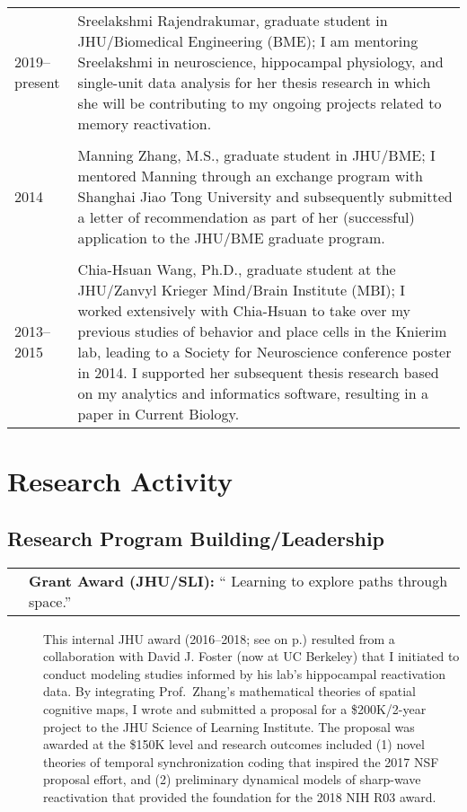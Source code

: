 \documentclass[10pt]{article}
\makeatletter
\newcommand{\unpubtitle}[1]{{\color{hopkinsblue} #1}}
\newcommand{\researchnote}[1]{
  \begin{description}
    \item[] {\hspace{2.2ex}\color{darkgray} #1}
  \end{description}
}
\newcommand{\researchactivity}[4]{
  \begin{minipage}[t]{\textwidth}
    \begin{tabular}{@{\hspace{2ex}}l>{\raggedright\arraybackslash}p{.8\textwidth}}
      \makebox[1.2in][l]{#1} & \textbf{#2:}
      ``\unpubtitle{#3}.'' 
    \end{tabular}
  \researchnote{\hspace{1ex} #4}
  \end{minipage}
  \medbreak
}
\makeatother
\begin{document}
\begin{tabular}{@{\hspace{0.2in}}l>{\raggedright\arraybackslash}p{}}
  2019--present \hspace{0.1in} & Sreelakshmi Rajendrakumar, graduate student in
  JHU/Biomedical Engineering (BME); I am mentoring Sreelakshmi in neuroscience,
  hippocampal physiology, and single-unit data analysis for her thesis research
  in which she will be contributing to my ongoing projects related to memory
  reactivation.\\
  \tabularnewline
  2014 & Manning Zhang, M.S., graduate student in JHU/BME; I mentored Manning
  through an exchange program with Shanghai Jiao Tong University and
  subsequently submitted a letter of recommendation as part of her (successful)
  application to the JHU/BME graduate program.\\
  \tabularnewline
  2013--2015 & Chia-Hsuan Wang, Ph.D., graduate student at the JHU/Zanvyl
  Krieger Mind/Brain Institute (MBI); I worked extensively with Chia-Hsuan to
  take over my previous studies of behavior and place cells in the Knierim lab,
  leading to a Society for Neuroscience conference poster in 2014. I supported
  her subsequent thesis research based on my analytics and informatics software,
  resulting in a paper in Current Biology.\\
\end{tabular}

\section*{Research Activity}

\subsection*{Research Program Building/Leadership}
\label{sec:resprogram}

\researchactivity
{Mar. 2016--2018}
{Grant Award (JHU/SLI)}
{Learning to explore paths through space}
{This internal JHU award (2016--2018; see \emph{\nameref{sec:prevsupport}} on
  p.\pageref{sec:prevsupport}) resulted from a collaboration with David J. Foster
  (now at UC Berkeley) that I initiated to conduct modeling studies informed
  by his lab’s hippocampal reactivation data. By integrating Prof.~Zhang’s
  mathematical theories of spatial cognitive maps, I wrote and submitted a
  proposal for a \$200K/2-year project to the JHU Science of Learning Institute.
  The proposal was awarded at the \$150K level and research outcomes included (1)
  novel theories of temporal synchronization coding that inspired the 2017 NSF
  proposal effort, and (2) preliminary dynamical models of sharp-wave reactivation
that provided the foundation for the 2018 NIH R03 award.}
\label{sec:ressli}
\end{document}
